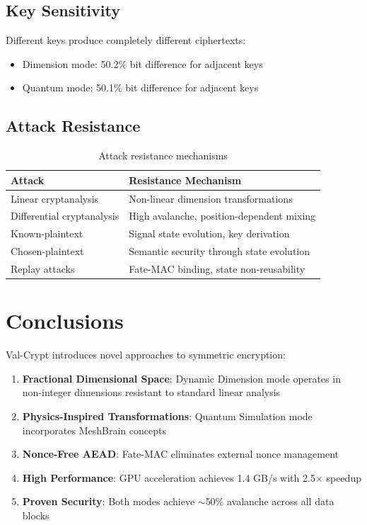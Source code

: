 \documentclass[11pt,a4paper]{article}
\begin{document}
\subsection{Key Sensitivity}

Different keys produce completely different ciphertexts:
\begin{itemize}
    \item Dimension mode: 50.2\% bit difference for adjacent keys
    \item Quantum mode: 50.1\% bit difference for adjacent keys
\end{itemize}

\subsection{Attack Resistance}

\begin{table}[h]
\centering
\begin{tabular}{ll}
\toprule
\textbf{Attack} & \textbf{Resistance Mechanism} \\
\midrule
Linear cryptanalysis & Non-linear dimension transformations \\
Differential cryptanalysis & High avalanche, position-dependent mixing \\
Known-plaintext & Signal state evolution, key derivation \\
Chosen-plaintext & Semantic security through state evolution \\
Replay attacks & Fate-MAC binding, state non-reusability \\
\bottomrule
\end{tabular}
\caption{Attack resistance mechanisms}
\end{table}

\section{Conclusions}

Val-Crypt introduces novel approaches to symmetric encryption:

\begin{enumerate}
    \item \textbf{Fractional Dimensional Space}: Dynamic Dimension mode operates in non-integer dimensions resistant to standard linear analysis
    \item \textbf{Physics-Inspired Transformations}: Quantum Simulation mode incorporates MeshBrain concepts
    \item \textbf{Nonce-Free AEAD}: Fate-MAC eliminates external nonce management
    \item \textbf{High Performance}: GPU acceleration achieves 1.4 GB/s with 2.5$\times$ speedup
    \item \textbf{Proven Security}: Both modes achieve $\sim$50\% avalanche across all data blocks
\end{enumerate}
\end{document}
